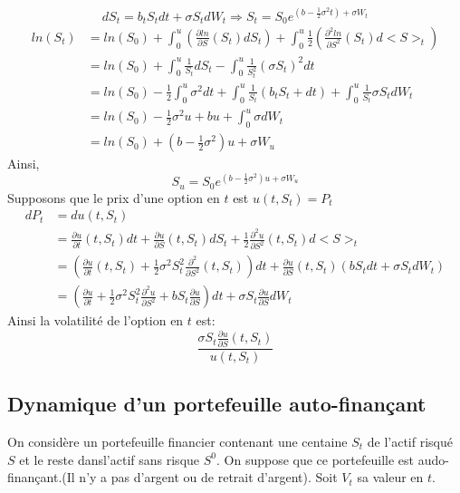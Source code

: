 \documentclass{article}
\theoremstyle{plain}
\theoremstyle{definition}
\begin{document}
\begin{equation}
dS_t=b_tS_tdt+\sigma S_t dW_t \Rightarrow S_t=S_0 e^{(b-\frac{1}{2}\sigma^2 t)+\sigma W_t}
\end{equation}
\begin{equation}
\begin{split}
ln(S_t)&=ln(S_0)+\int_0^u (\frac{\partial ln}{\partial S}(S_t) dS_t)+\int_0^u \frac{1}{2}(\frac{\partial^2 ln}{\partial S^2}(S_t)d<S>_t)\\
&=ln(S_0)+\int_0^u\frac{1}{S_t} dS_t -\int_0^u \frac{1}{S_t^2}(\sigma S_t)^2 dt\\
&=ln(S_0)-\frac{1}{2}\int_0^u\sigma^2 dt + \int_0^u \frac{1}{S_t} (b_t S_t+dt)+\int_0^u \frac{1}{S_t}\sigma S_t dW_t\\
&=ln(S_0)-\frac{1}{2}\sigma^2 u+b u+\int_0^u\sigma d W_t\\
&=ln(S_0)+(b-\frac{1}{2}\sigma^2)u+\sigma W_u
\end{split}
\end{equation}
Ainsi,
\begin{equation}
S_u=S_0e^{(b-\frac{1}{2}\sigma^2)u+\sigma W_u}
\end{equation}
Supposons que le prix d'une option en $t$ est $u(t,S_t)=P_t$
\begin{equation}
\begin{split}
dP_t&=du(t,S_t)\\
&=\frac{\partial u}{\partial t}(t, S_t)dt+\frac{\partial u}{\partial S}(t,S_t)dS_t+\frac{1}{2}\frac{\partial^2 u}{\partial S^2}(t,S_t)d<S>_t\\
&=(\frac{\partial u}{\partial t}(t,S_t)+\frac{1}{2}\sigma^2S_t^2\frac{\partial^2}{\partial S^2}(t, S_t))dt+\frac{\partial u}{\partial S}(t, S_t)(bS_tdt + \sigma S_tdW_t)\\
&=(\frac{\partial u}{\partial t}+\frac{1}{2}\sigma^2 S_t^2\frac{\partial^2 u}{\partial S^2}+bS_t\frac{\partial u}{\partial S})dt+\sigma S_t\frac{\partial u}{\partial S}dW_t
\end{split}
\end{equation}
Ainsi la volatilit\'e de l'option en $t$ est:
\begin{equation}
\frac{\sigma S_t \frac{\partial u}{\partial S}(t, S_t)}{u(t, S_t)}
\end{equation}

\subsection{Dynamique d'un portefeuille auto-finan\c{c}ant}
On consid\`ere un portefeuille financier contenant une centaine $S_t$ de l'actif risqu\'e $S$ et le reste dansl'actif sans risque $S^0$.
On suppose que ce portefeuille est audo-finan\c{c}ant.(Il n'y a pas d'argent ou de retrait d'argent). Soit $V_t$
 sa valeur en $t$.
 
\end{document}
